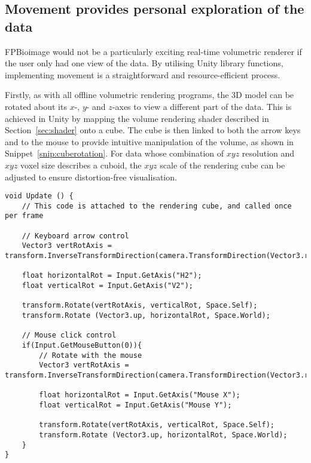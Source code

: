 



\subsection{Movement provides personal exploration of the data}
FPBioimage would not be a particularly exciting real-time volumetric renderer if the user only had one view of the data.
By utilising Unity library functions, implementing movement is a straightforward and resource-efficient process.

Firstly, as with all offline volumetric rendering programs, the 3D model can be rotated about its $x$-, $y$- and $z$-axes to view a different part of the data.
This is achieved in Unity by mapping the volume rendering shader described in Section~\ref{sec:shader} onto a cube.
The cube is then linked to both the arrow keys and to the mouse to provide intuitive manipulation of the volume, as shown in Snippet~\ref{snip:cuberotation}.
For data whose combination of $xyz$ resolution and $xyz$ voxel size describes a cuboid, the $xyz$ scale of the rendering cube can be adjusted to ensure distortion-free visualisation.

\begin{lstfloat}
\begin{lstlisting}[language={[Sharp]c}, label={snip:cuberotation}, caption={C\# code using built-in Unity functions for rotating the volumetric data}]
void Update () {
	// This code is attached to the rendering cube, and called once per frame

	// Keyboard arrow control
	Vector3 vertRotAxis = transform.InverseTransformDirection(camera.TransformDirection(Vector3.right)).normalized;

	float horizontalRot = Input.GetAxis("H2");
	float verticalRot = Input.GetAxis("V2");

	transform.Rotate(vertRotAxis, verticalRot, Space.Self);
	transform.Rotate (Vector3.up, horizontalRot, Space.World);

	// Mouse click control
	if(Input.GetMouseButton(0)){
		// Rotate with the mouse
		Vector3 vertRotAxis = transform.InverseTransformDirection(camera.TransformDirection(Vector3.right)).normalized;

		float horizontalRot = Input.GetAxis("Mouse X");
		float verticalRot = Input.GetAxis("Mouse Y");

		transform.Rotate(vertRotAxis, verticalRot, Space.Self);
		transform.Rotate (Vector3.up, horizontalRot, Space.World);
	}
}
\end{lstlisting}
\end{lstfloat}

